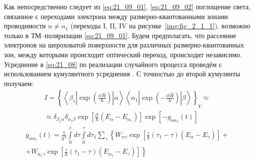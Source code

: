 Как непосредственно следует из \eqref{eq:21_09_01}, \eqref{eq:21_09_02} поглощение света, связанное с переходами электрона между размерно-квантованными зонами проводимости $n \neq n_1$  (переходы I, II, IV на рисунке~\ref{img:fig_2_1_1}), возможно только в ТМ–поляризации \eqref{eq:21_09_01}. Будем предполагать, что рассеяние электронов на шероховатой поверхности для различных размерно-квантованных зон, между которыми происходит оптический переход, происходит независимо. Усреднение в \eqref{eq:21_08} по реализации случайного процесса проведём с использованием кумулянтного усреднения \cite{Kubo1962}. С точностью до второй кумулянты получаем:
\begin{multline} \label{eq:21_09_04}
I = {\left\lbrace  \left\langle \beta_1 \left| \exp \left(\frac{it\hat{H}}{\hbar}\right) \right|\alpha\right\rangle \left\langle \alpha_1 \left| \exp \left(-\frac{it\hat{H}}{\hbar}\right) \right|\beta\right\rangle \right\rbrace }_V \approx \\
\approx \delta_{\beta_1\alpha} \delta_{\alpha_1\beta} \exp{\left[\frac{it}{\hbar} \left(E_{\alpha} - E_{\alpha_1} \right)  \right] } \exp{\left[- g_{\alpha\alpha_1}(t) \right]}
\end{multline} 
\begin{multline} \label{21_09_06}
g_{\alpha\alpha_1 }(t)=\frac{1}{{\hbar }^2}\int\limits_0^t d \tau \int\limits_0^{\tau }d \tau_1 \sum_{\gamma} \left\{ W_{\alpha\gamma }\exp \left[\frac{i}{\hbar }\left(\tau_1-\tau \right) \left(E_{\alpha}-E_{\gamma }\right)\right] + \right.\\
\left. + W_{\alpha_1\gamma} \exp \left[\frac{i}{\hbar }\left(\tau_1-\tau \right)\left(E_{\alpha_1}-E_{\gamma }\right)\right] \right\}
\end{multline} 

